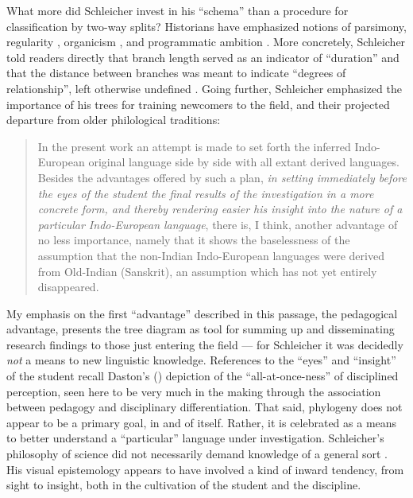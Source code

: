 \documentclass[output=paper]{langscibook}
\begin{document}
What more did Schleicher invest in his ``schema'' than a procedure for classification by two-way splits? Historians have emphasized notions of parsimony, regularity \citep[117, 114-115]{GeislerList2013}, organicism \citep[56]{Wells1987}, and programmatic ambition \citep[755]{Koerner1975}. More concretely, Schleicher told readers directly that branch length served as an indicator of ``duration'' and that the distance between branches was meant to indicate ``degrees of relationship'', left otherwise undefined \citep[8]{Schleicher1853}. Going further, Schleicher emphasized the importance of his trees for training newcomers to the field, and their projected departure from older philological traditions:

\begin{quotation}
In the present work an attempt is made to set forth the inferred Indo-European original language side by side with all extant derived languages. Besides the advantages offered by such a plan, \emph{in setting immediately before the eyes of the student the final results of the investigation in a more concrete form, and thereby rendering easier his insight into the nature of a particular Indo-European language}, there is, I think, another advantage of no less importance, namely that it shows the baselessness of the assumption that the non-Indian Indo-European languages were derived from Old-Indian (Sanskrit), an assumption which has not yet entirely disappeared. \citep[94]{Schleicher196718612}
\end{quotation}

My emphasis on the first ``advantage'' described in this passage, the pedagogical advantage, presents the tree diagram as tool for summing up and disseminating research findings to those just entering the field — for Schleicher it was decidedly \emph{not} a means to new linguistic knowledge. References to the ``eyes'' and ``insight'' of the student recall Daston's (\citeyear{Daston2008}) depiction of the ``all-at-once-ness'' of disciplined perception, seen here to be very much in the making through the association between pedagogy and disciplinary differentiation. That said, phylogeny does not appear to be a primary goal, in and of itself. Rather, it is celebrated as a means to better understand a ``particular'' language under investigation. Schleicher's philosophy of science did not necessarily demand knowledge of a general sort \citep{Nyhart2012}. His visual epistemology appears to have involved a kind of inward tendency, from sight to insight, both in the cultivation of the student and the discipline.
\end{document}
